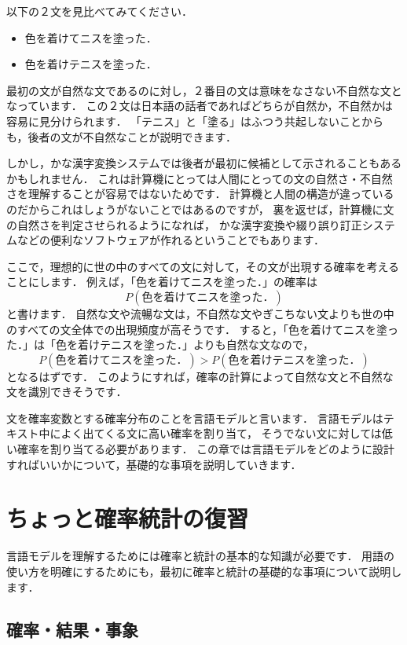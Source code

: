 \documentclass[11pt]{report}
\begin{document}
以下の２文を見比べてみてください．
\begin{itemize}
	\item 色を着けてニスを塗った．
	\item 色を着けテニスを塗った．
\end{itemize}
最初の文が自然な文であるのに対し，２番目の文は意味をなさない不自然な文となっています．
この２文は日本語の話者であればどちらが自然か，不自然かは容易に見分けられます．
「テニス」と「塗る」はふつう共起しないことからも，後者の文が不自然なことが説明できます．

しかし，かな漢字変換システムでは後者が最初に候補として示されることもあるかもしれません．
これは計算機にとっては人間にとっての文の自然さ・不自然さを理解することが容易ではないためです．
計算機と人間の構造が違っているのだからこれはしょうがないことではあるのですが，
裏を返せば，計算機に文の自然さを判定させられるようになれば，
かな漢字変換や綴り誤り訂正システムなどの便利なソフトウェアが作れるということでもあります．

ここで，理想的に世の中のすべての文に対して，その文が出現する確率を考えることにします．
例えば，「色を着けてニスを塗った．」の確率は
\begin{equation*}
	P(\mathrm{色を着けてニスを塗った．})
\end{equation*}
と書けます．
自然な文や流暢な文は，不自然な文やぎこちない文よりも世の中のすべての文全体での出現頻度が高そうです．
すると，「色を着けてニスを塗った．」は「色を着けテニスを塗った．」よりも自然な文なので，
\begin{equation*}
	P(\mathrm{色を着けてニスを塗った．})
	>
	P(\mathrm{色を着けテニスを塗った．})
\end{equation*}
となるはずです．
このようにすれば，確率の計算によって自然な文と不自然な文を識別できそうです．

文を確率変数とする確率分布のことを言語モデルと言います．
言語モデルはテキスト中によく出てくる文に高い確率を割り当て，
そうでない文に対しては低い確率を割り当てる必要があります．
この章では言語モデルをどのように設計すればいいかについて，基礎的な事項を説明していきます．

\section{ちょっと確率統計の復習}

言語モデルを理解するためには確率と統計の基本的な知識が必要です．
用語の使い方を明確にするためにも，最初に確率と統計の基礎的な事項について説明します．

\subsection{確率・結果・事象}
\end{document}
